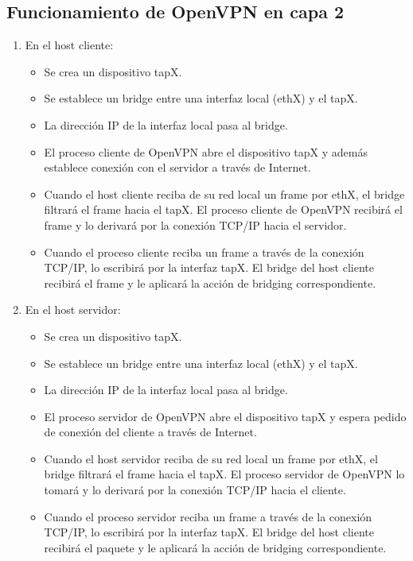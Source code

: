 \subsection{Funcionamiento de OpenVPN en capa 2}

\begin{enumerate}
	\item En el host cliente:
	\begin{itemize}
		\item Se crea un dispositivo tapX.
		\item Se establece un bridge entre una interfaz local (ethX) y el tapX.
		\item La dirección IP de la interfaz local pasa al bridge.
		\item El proceso cliente de OpenVPN abre el dispositivo tapX y además establece conexión con el servidor a través de Internet.
		\item Cuando el host cliente reciba de su red local un frame por ethX, el bridge filtrará el frame hacia el tapX. El proceso cliente de OpenVPN recibirá el frame y lo derivará por la conexión TCP/IP hacia el servidor.
		\item Cuando el proceso cliente reciba un frame a través de la conexión TCP/IP, lo escribirá por la interfaz tapX. El bridge del host cliente recibirá el frame y le aplicará la acción de bridging correspondiente. 
	\end{itemize}
	\item En el host servidor:
	\begin{itemize}
		\item Se crea un dispositivo tapX.
		\item Se establece un bridge entre una interfaz local (ethX) y el tapX.
		\item La dirección IP de la interfaz local pasa al bridge.
		\item El proceso servidor de OpenVPN abre el dispositivo tapX y espera pedido de conexión del cliente a través de Internet.
		\item Cuando el host servidor reciba de su red local un frame por ethX, el bridge filtrará el frame hacia el tapX. El proceso servidor de OpenVPN lo tomará y lo derivará por la conexión TCP/IP hacia el cliente.
		\item Cuando el proceso servidor reciba un frame a través de la conexión TCP/IP, lo escribirá por la interfaz tapX. El bridge del host cliente recibirá el paquete y le aplicará la acción de bridging correspondiente. 
	\end{itemize}
\end{enumerate}

